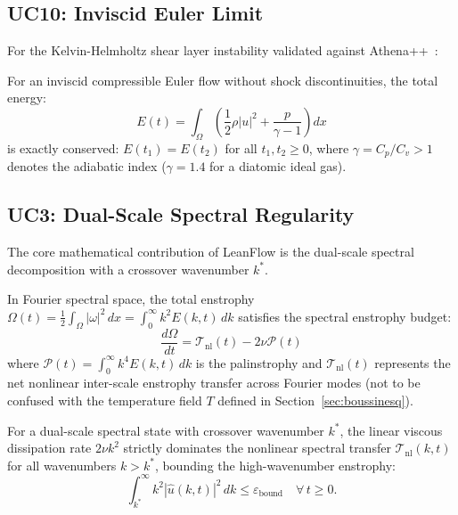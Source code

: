 \subsection{UC10: Inviscid Euler Limit}

For the Kelvin-Helmholtz shear layer instability validated against Athena++~\citep{stone2020athena}:

\begin{theorem}
\label{thm:euler_energy}
For an inviscid compressible Euler flow without shock discontinuities, the total energy:
\begin{equation}
  E(t) = \int_\Omega \left( \frac{1}{2}\rho |u|^2 + \frac{p}{\gamma - 1} \right) dx
\end{equation}
is exactly conserved: $E(t_1) = E(t_2)$ for all $t_1, t_2 \ge 0$, where $\gamma = C_p / C_v > 1$ denotes the adiabatic index ($\gamma = 1.4$ for a diatomic ideal gas).
\end{theorem}

\subsection{UC3: Dual-Scale Spectral Regularity}
\label{subsec:uc3_spectral}

The core mathematical contribution of LeanFlow is the dual-scale spectral decomposition with a crossover wavenumber $k^*$.

In Fourier spectral space, the total enstrophy $\Omega(t) = \frac{1}{2}\int_\Omega |\omega|^2\,dx = \int_0^\infty k^2 E(k,t)\,dk$ satisfies the spectral enstrophy budget:
\begin{equation}
  \label{eq:enstrophy_budget}
  \frac{d\Omega}{dt} = \mathcal{T}_{\text{nl}}(t) - 2\nu \mathcal{P}(t)
\end{equation}
where $\mathcal{P}(t) = \int_0^\infty k^4 E(k,t)\,dk$ is the palinstrophy and $\mathcal{T}_{\text{nl}}(t)$ represents the net nonlinear inter-scale enstrophy transfer across Fourier modes (not to be confused with the temperature field $T$ defined in Section~\ref{sec:boussinesq}).

\begin{axiom}
\label{ax:enstrophy_suppression}
For a dual-scale spectral state with crossover wavenumber $k^*$, the linear viscous dissipation rate $2\nu k^2$ strictly dominates the nonlinear spectral transfer $\mathcal{T}_{\text{nl}}(k,t)$ for all wavenumbers $k > k^*$, bounding the high-wavenumber enstrophy:
\begin{equation}
  \int_{k^*}^{\infty} k^2 |\hat{u}(k,t)|^2\,dk \leq \varepsilon_{\text{bound}} \quad \forall\, t \ge 0.
\end{equation}
\end{axiom}

